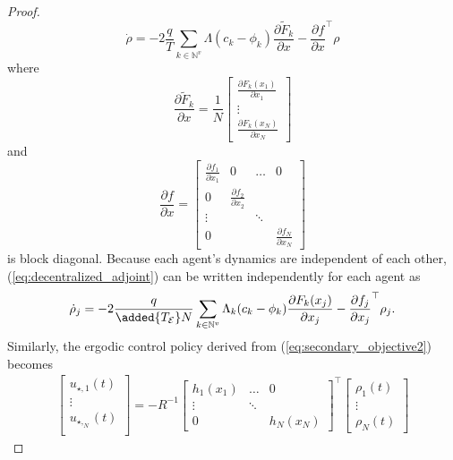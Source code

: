 \documentclass[letterpaper, 10 pt, conference]{ieeeconf}  %
\begin{document}
\begin{proof}
\begin{equation}
\dot{\rho} = -2 \frac{q}{T}\sum_{k \in \mathbb{N}^v} \Lambda \left( c_k - \phi_k \right) \frac{\partial \tilde{F}_k}{\partial x} - \frac{\partial f}{\partial x}^\top \rho
\end{equation}
where 
\begin{equation*}
\frac{\partial \tilde{F}_k}{\partial x} = \frac{1}{N} \begin{bmatrix}
\frac{\partial F_k (x_1)}{\partial x_1} \\
\vdots \\
\frac{\partial F_k(x_N)}{\partial x_N}
\end{bmatrix}
\end{equation*}
and 
\begin{equation*}
\frac{\partial f}{\partial x} =
\begin{bmatrix}
\frac{\partial f_1}{\partial x_1} & 0 & \ldots & 0 \\
0 & \frac{\partial f_{2}}{\partial x_{2}} \\
\vdots & & \ddots  & \\
0 &  & & \frac{\partial f_N}{\partial x_N}
\end{bmatrix}
\end{equation*}
is block diagonal.
Because each agent's dynamics are independent of each other, (\ref{eq:decentralized_adjoint}) can be written independently for each agent as
\begin{equation*}
\dot{\rho}_j = -2\frac{q}{\added{T_\mathcal{E}} N} \sum_{k \in \mathbb{N}^v} \Lambda_k (c_k - \phi_k) \frac{\partial F_k(x_j)}{\partial x_j} - \frac{\partial f_j}{\partial x_j}^\top \rho_j.
\end{equation*}
Similarly, the ergodic control policy derived from (\ref{eq:secondary_objective2}) becomes
\begin{multline} \label{eq:expanded_control}
\begin{bmatrix}
u_{\star,1} (t) \\
\vdots \\
u_{\star,_N}(t) \\
\end{bmatrix}
=
-R^{-1}  
 \begin{bmatrix}
h_1(x_1) & \ldots & 0\\
\vdots& \ddots & \\
0 & & h_N(x_N)
\end{bmatrix} ^\top
\begin{bmatrix}
\rho_1 (t) \\
\vdots \\
\rho_N(t)
\end{bmatrix}

\end{multline}
\end{proof}
\end{document}
